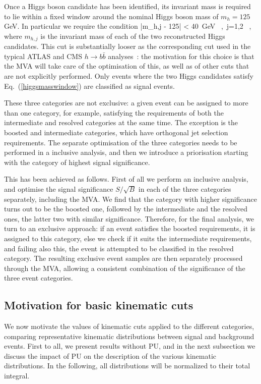 Once a Higgs boson candidate has been identified,
its invariant mass is required to lie within a fixed window
around the nominal Higgs boson mass of $m_h= 125$
GeV.
%
In particular we require the condition
\be
\label{higgsmasswindow}
|m_{h,j} - 125| < 40~{\rm GeV} \, ,\, j=1,2 \, ,
\ee
where $m_{h,j}$ is the invariant mass of each of the two reconstructed  Higgs candidates.
%
This cut is substantially looser as the corresponding
cut used in the typical ATLAS and CMS $h\to b\bar{b}$
analyses~\cite{Aad:2012gxa,Chatrchyan:2013zna}: the motivation
for this choice is that the MVA will take care of the optimisation of this,
as well as of other cuts that are not explicitly performed.
%
Only events where the two Higgs candidates satisfy
Eq.~(\ref{higgsmasswindow}) are classified as signal events.
%

These three categories are not exclusive:
a given event can be assigned to more than one category, for
example, satisfying the requirements of both the intermediate
and resolved
categories at the same time.
%
The exception is the boosted and intermediate categories, which have
orthogonal jet selection requirements.
%
The separate optimisation of the three categories needs to be performed in
a inclusive analysis, and then we introduce a
 priorisation starting with the category of highest signal significance.


 This has been achieved as follows.
First of all we perform an inclusive analysis, and optimise the
signal significance
$S/\sqrt{B}$ in each of the three categories separately, including
the MVA.
%
We find that the category with higher significance turns out to be
the boosted one,
followed by the intermediate and the resolved ones, the latter two
with similar significance.
%
Therefore, for the final analysis, we turn to an exclusive approach:
if an event satisfies the boosted requirements, it is assigned to
this category, else we check if it suits the intermediate
requirements, and failing also this, the event is attempted to
be classified in the
resolved category.
%
The resulting exclusive event samples are then separately processed
through the MVA, allowing a consistent combination
of the significance of the three event categories.

\subsection{Motivation for basic kinematic cuts}

We now motivate the values of
kinematic cuts applied to the different categories, 
comparing representative kinematic distributions between
signal and background events.
%
First to all, we present results without PU, and in the next
subsection we discuss the impact of PU
on the description of the various kinematic
distributions.
%
In the following, all
distributions will be normalized to their total integral.

